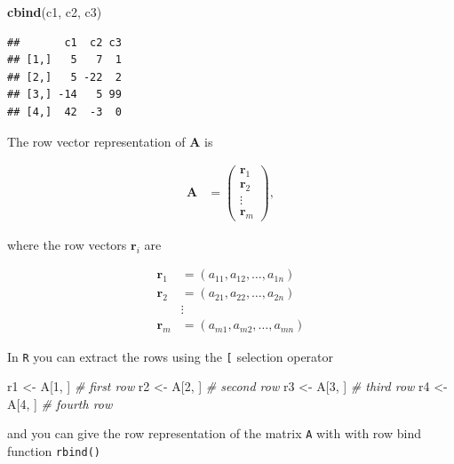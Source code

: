 \documentclass[
]{book}
\newenvironment{Shaded}{\begin{snugshade}}{\end{snugshade}}
\newcommand{\CommentTok}[1]{\textcolor[rgb]{0.56,0.35,0.01}{\textit{#1}}}
\newcommand{\DecValTok}[1]{\textcolor[rgb]{0.00,0.00,0.81}{#1}}
\newcommand{\KeywordTok}[1]{\textcolor[rgb]{0.13,0.29,0.53}{\textbf{#1}}}
\newcommand{\NormalTok}[1]{#1}
\newcommand{\StringTok}[1]{\textcolor[rgb]{0.31,0.60,0.02}{#1}}
\theoremstyle{definition}
\theoremstyle{definition}
\theoremstyle{definition}
\theoremstyle{remark}
\begin{document}
\begin{Shaded}
\begin{Highlighting}[]
\KeywordTok{cbind}\NormalTok{(c1, c2, c3)}
\end{Highlighting}
\end{Shaded}

\begin{verbatim}
##       c1  c2 c3
## [1,]   5   7  1
## [2,]   5 -22  2
## [3,] -14   5 99
## [4,]  42  -3  0
\end{verbatim}

The row vector representation of \(\mathbf{A}\) is

\[
\begin{aligned}
\mathbf{A} & = \begin{pmatrix} \mathbf{r}_{1} \\ \mathbf{r}_{2} \\ \vdots \\ \mathbf{r}_{m} \end{pmatrix},
\end{aligned}
\]

where the row vectors \(\mathbf{r}_i\) are

\[
\begin{aligned}
\mathbf{r}_1 & = \left( a_{11}, a_{12}, \ldots, a_{1n} \right) \\
\mathbf{r}_2 & = \left( a_{21}, a_{22}, \ldots, a_{2n} \right) \\
& \vdots \\
\mathbf{r}_m & = \left( a_{m1}, a_{m2}, \ldots, a_{mn} \right)
\end{aligned}
\]

In \texttt{R} you can extract the rows using the \texttt{{[}} selection operator

\begin{Shaded}
\begin{Highlighting}[]
\NormalTok{r1 <-}\StringTok{ }\NormalTok{A[}\DecValTok{1}\NormalTok{, ] }\CommentTok{# first row}
\NormalTok{r2 <-}\StringTok{ }\NormalTok{A[}\DecValTok{2}\NormalTok{, ] }\CommentTok{# second row}
\NormalTok{r3 <-}\StringTok{ }\NormalTok{A[}\DecValTok{3}\NormalTok{, ] }\CommentTok{# third row}
\NormalTok{r4 <-}\StringTok{ }\NormalTok{A[}\DecValTok{4}\NormalTok{, ] }\CommentTok{# fourth row}
\end{Highlighting}
\end{Shaded}

and you can give the row representation of the matrix \texttt{A} with with row bind function \texttt{rbind()}
\end{document}
